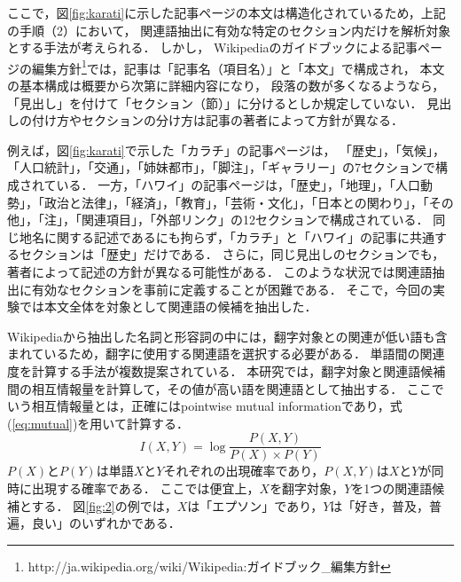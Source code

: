 \documentclass[japanese]{jnlp_1.4}
\begin{document}
{ここで，図{\ref{fig:karati}}に示した記事ページの本文は構造化されているため，上記の手順（2）において，
関連語抽出に有効な特定のセクション内だけを解析対象とする手法が考えられる．
しかし，
Wikipediaのガイドブックによる記事ページの編集方針\footnote{http://ja.wikipedia.org/wiki/Wikipedia:ガイドブック\_編集方針}では，記事は{\mbox「記事名（項目名）」}と{\mbox「本文」}で構成され，
本文の基本構成は概要から次第に詳細内容になり，
段落の数が多くなるようなら，「見出し」を付けて「セクション（節）」に分けるとしか規定していない．
見出しの付け方やセクションの分け方は記事の著者によって方針が異なる．

例えば，図{\ref{fig:karati}}で示した「カラチ」の記事ページは，
\pagebreak
「歴史」，「気候」，「人口統計」，「交通」，「姉妹都市」，「脚注」，「ギャラリー」の7セクションで構成されている．
一方，「ハワイ」の記事ページは，「歴史」，「地理」，「人口動勢」，「政治と法律」，「経済」，「教育」，「芸術・文化」，「日本との関わり」，「その他」，「注」，「関連項目」，「外部リンク」の12セクションで構成されている．
同じ地名に関する記述であるにも拘らず，「カラチ」と「ハワイ」の記事に共通するセクションは「歴史」だけである．
さらに，同じ見出しのセクションでも，著者によって記述の方針が異なる可能性がある．
このような状況では関連語抽出に有効なセクションを事前に定義することが困難である．
そこで，今回の実験では本文全体を対象として関連語の候補を抽出した．

Wikipediaから抽出した名詞と形容詞の中には，翻字対象との関連が低い語も含まれているため，翻字に使用する関連語を選択する必要がある．
単語間の関連度を計算する手法\cite{Article_22,Article_25}が複数提案されている．
本研究では，翻字対象と関連語候補間の相互情報量\cite{Article_03,Article_15}を計算して，その値が高い語を関連語として抽出する．
ここでいう相互情報量とは，正確にはpointwise mutual informationであり，式(\ref{eq:mutual})を用いて計算する．
\begin{equation}
I(X,Y)=\log \frac{P(X,Y)}{P(X)\times P(Y)} \label{eq:mutual}
\end{equation}
$P(X)$と$P(Y)$は単語$X$と$Y$それぞれの出現確率であり，$P(X,Y)$は$X$と$Y$が同時に出現する確率である．
ここでは便宜上，$X$を翻字対象，$Y$を1つの関連語候補とする．
図\ref{fig:2}の例では，$X$は「エプソン」であり，$Y$は「好き，普及，普遍，良い」のいずれかである．

}
\end{document}
